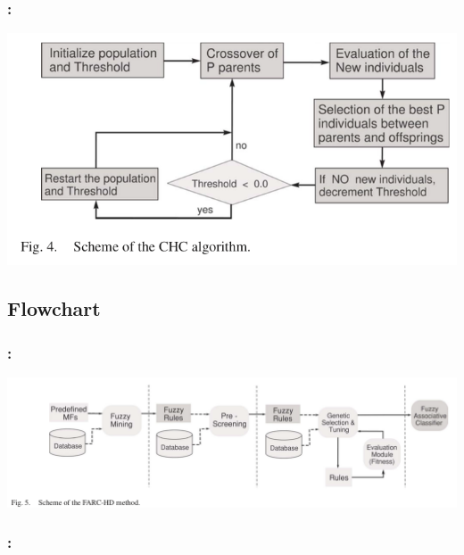 \documentclass{beamer}
\begin{document}
\begin{CJK*}{UTF8}{bsmi}
\begin{frame}
\end{frame}


\begin{frame}
	\frametitle{\insertsection : \insertsubsection}
	
	\begin{center}
		\includegraphics[height=.65\textheight]{./6.png}
	\end{center}
\end{frame}

\subsection{Flowchart}

\begin{frame}
	\frametitle{\insertsection : \insertsubsection}
	
	\begin{center}
		\includegraphics[height=.65\textheight]{./7.png}
	\end{center}
\end{frame}
\begin{frame}
	\frametitle{\insertsection : \insertsubsection}
	

\end{frame}
\end{CJK*}
\end{document}
